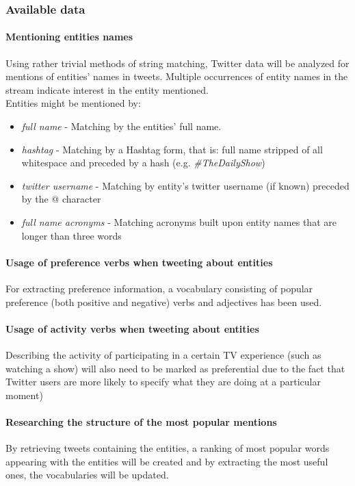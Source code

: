 \subsubsection{Available data}
\paragraph{Mentioning entities names}
Using rather trivial methods of string matching, Twitter data will be analyzed for
mentions of entities' names in tweets. Multiple occurrences of entity names in the
stream indicate interest in the entity mentioned. \\
Entities might be mentioned by:
\begin{itemize}
  \item \textit{full name} - Matching by the entities' full name.
  \item \textit{hashtag} - Matching by a Hashtag form, that is: full name stripped of all whitespace and preceded by a hash (e.g. \textit{\#TheDailyShow})
  \item \textit{twitter username} - Matching by entity's twitter username (if known) preceded by the @ character
  \item \textit{full name acronyms} - Matching acronyms built upon entity names that are longer than three words
\end{itemize}
\paragraph{Usage of preference verbs when tweeting about entities}
For extracting preference information, a vocabulary consisting of
popular preference (both positive and negative) verbs and adjectives has been used.
\paragraph{Usage of activity verbs when tweeting about entities}
Describing the activity of participating in a certain TV experience (such
as watching a show) will also need to be marked as preferential due to the
fact that Twitter users are more likely to specify what they are doing at a
particular moment)
\paragraph{Researching the structure of the most popular mentions}
By retrieving tweets containing the entities, a ranking of most popular words
appearing with the entities will be created and by extracting the most useful
ones, the vocabularies will be updated.
